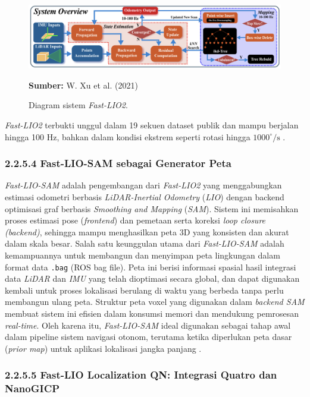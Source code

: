 \begin{figure}[H]
    \centering
    \includegraphics[width=1\textwidth]{gambar/bab2/fast-lio2.png}
    \caption{Diagram sistem \emph{Fast-LIO2}.}
    \label{fig:fastlio2}
    \footnotesize{\textbf{Sumber:} W. Xu et al. (2021)}
\end{figure}

\emph{Fast-LIO2} terbukti unggul dalam 19 sekuen dataset publik dan mampu berjalan hingga 100 Hz, bahkan dalam kondisi ekstrem seperti rotasi hingga $1000^\circ/\text{s}$ \cite{xu2022fastlio}.

\subsubsection{2.2.5.4 Fast-LIO-SAM sebagai Generator Peta}

\emph{Fast-LIO-SAM} adalah pengembangan dari \emph{Fast-LIO2} yang menggabungkan estimasi odometri berbasis \emph{LiDAR-Inertial Odometry} (\emph{LIO}) dengan backend optimisasi graf berbasis \emph{Smoothing and Mapping} (\emph{SAM}). Sistem ini memisahkan proses estimasi pose (\emph{frontend}) dan pemetaan serta koreksi \emph{loop closure (backend)}, sehingga mampu menghasilkan peta 3D yang konsisten dan akurat dalam skala besar. Salah satu keunggulan utama dari \emph{Fast-LIO-SAM} adalah kemampuannya untuk membangun dan menyimpan peta lingkungan dalam format data \texttt{.bag} (ROS bag file). Peta ini berisi informasi spasial hasil integrasi data \emph{LiDAR} dan \emph{IMU} yang telah dioptimasi secara global, dan dapat digunakan kembali untuk proses lokalisasi berulang di waktu yang berbeda tanpa perlu membangun ulang peta. Struktur peta voxel yang digunakan dalam \emph{backend SAM} membuat sistem ini efisien dalam konsumsi memori dan mendukung pemrosesan \emph{real-time}. Oleh karena itu, \emph{Fast-LIO-SAM} ideal digunakan sebagai tahap awal dalam pipeline sistem navigasi otonom, terutama ketika diperlukan peta dasar (\emph{prior map}) untuk aplikasi lokalisasi jangka panjang \cite{xu2022fastlio}.

\subsubsection{2.2.5.5 Fast-LIO Localization QN: Integrasi Quatro dan NanoGICP}

